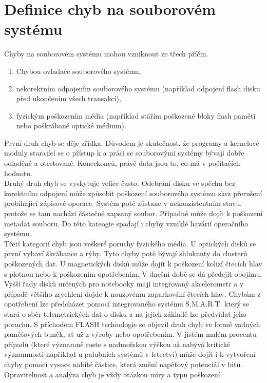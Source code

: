 \chapter{Definice chyb na souborovém systému}
Chyby na souborovém systému mohou vzniknout ze třech příčin. 
\begin{enumerate}
    \item Chybou ovladače souborového systému,
    \item nekorektním odpojením souborového systému (například odpojení flash disku před ukončením všech transakcí),
    \item fyzickým poškozením média (například stářím poškozené bloky flash paměti nebo poškrábané optické médium).
\end{enumerate}
První druh chyb se děje zřídka. Důvodem je skutečnost, že programy a kernelové moduly starající se o přístup k a práci se souborovými systémy bývají dobře odladěné a otestované. Koneckonců, právě data jsou to, co má v počítačích hodnotu.\\
Druhý druh chyb se vyskytuje velice často. Odebrání disku ve spěchu bez korektního odpojení může způsobit poškození souborového systému skrz přerušení probíhající zápisové operace. Systém poté zůstane v nekonzistentním stavu, protože se tam nachází částečně zapsaný soubor. Případně může dojít k poškození metadat souboru. Do této kateogie spadají i chyby vzniklé havárií operačního systému.\\
Třetí kategorií chyb jsou veškeré poruchy fyzického média. U optických disků se první vybaví škrábance a rýhy. Tyto chyby poté bývají shluknuty do clusterů poškozených dat. U magnetických disků může dojít k poškození kolizí čtecích hlav s plotnou nebo k poškozením opotřebením. V dnešní době se dá předejít obojímu. Vyšší řady disků určených pro notebooky mají integrovaný akcelerometr a v případě většího zrychlení dojde k nouzovému zaparkování čtecích hlav. Chybám z opotřebení lze předcházet pomocí integrovaného systému S.M.A.R.T. který se stará o sběr telemetrických dat o disku a na jejich základě lze předvídat jeho poruchu. S příchodem FLASH technologie se objevil druh chyb ve formě vadných paměťových buněk, ať už z výroby nebo opotřebením. V jistém malém procentu případů (které významně roste s nadmořskou výškou až nabývá kritické významnosti například u palubních systémů v letectví) může dojít i k vytvoření chyby pomocí vysoce nabité částice, která změní napěťový potenciál v bitu.\\
Opravitelnost a analýza chyb je vždy otázkou míry a typu poškození.

